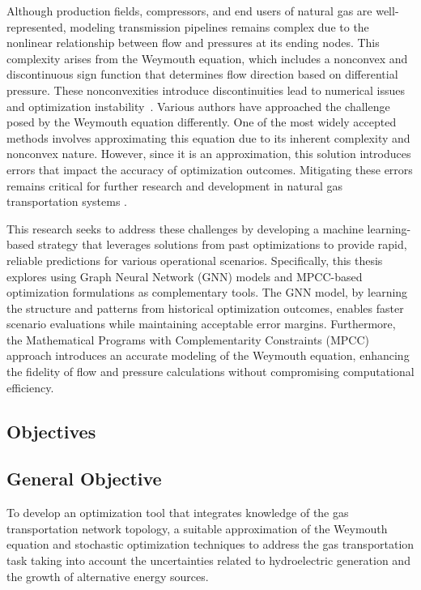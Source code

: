 Although production fields, compressors, and end users of natural gas are well-represented, modeling transmission pipelines remains complex due to the nonlinear relationship between flow and pressures at its ending nodes. This complexity arises from the Weymouth equation, which includes a nonconvex and discontinuous sign function that determines flow direction based on differential pressure. These nonconvexities introduce discontinuities lead to numerical issues and optimization instability~\cite{YANG2020106023, JIANG2021106460}. Various authors have approached the challenge posed by the Weymouth equation differently. One of the most widely accepted methods involves approximating this equation due to its inherent complexity and nonconvex nature. However, since it is an approximation, this solution introduces errors that impact the accuracy of optimization outcomes. Mitigating these errors remains critical for further research and development in natural gas transportation systems \cite{review}.


This research seeks to address these challenges by developing a machine learning-based strategy that leverages solutions from past optimizations to provide rapid, reliable predictions for various operational scenarios. Specifically, this thesis explores using Graph Neural Network (GNN) models and MPCC-based optimization formulations as complementary tools. The GNN model, by learning the structure and patterns from historical optimization outcomes, enables faster scenario evaluations while maintaining acceptable error margins. Furthermore, the Mathematical Programs with Complementarity Constraints (MPCC) approach introduces an accurate modeling of the Weymouth equation, enhancing the fidelity of flow and pressure calculations without compromising computational efficiency.





\subsection{Objectives}

\subsection{General Objective}
To develop an optimization tool that integrates knowledge of the gas transportation network topology, a suitable approximation of the Weymouth equation and stochastic optimization techniques to address the gas transportation task taking into account the uncertainties related to hydroelectric generation and the growth of alternative energy sources.

